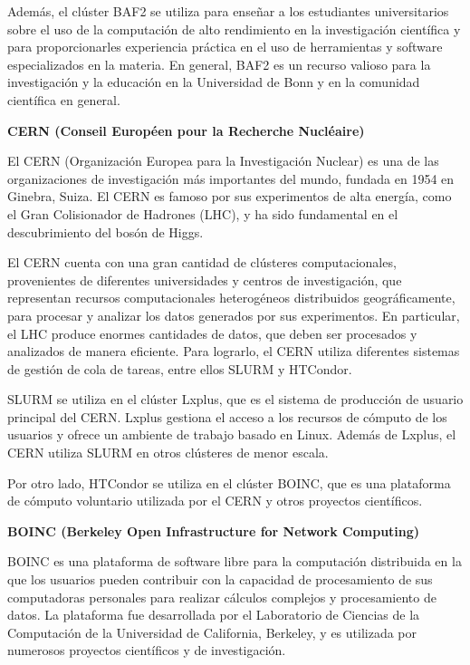 \begin{spacing}{1.5}
  Además, el clúster BAF2 se utiliza para enseñar a los estudiantes universitarios sobre el uso de la computación de alto rendimiento en la investigación científica y para proporcionarles experiencia práctica en el uso de herramientas y software especializados en la materia. En general, BAF2 es un recurso valioso para la investigación y la educación en la Universidad de Bonn y en la comunidad científica en general.

  \textbf{CERN (Conseil Européen pour la Recherche Nucléaire)}
  
  El CERN (Organización Europea para la Investigación Nuclear) es una de las organizaciones de investigación más importantes del mundo, fundada en 1954 en Ginebra, Suiza. El CERN es famoso por sus experimentos de alta energía, como el Gran Colisionador de Hadrones (LHC), y ha sido fundamental en el descubrimiento del bosón de Higgs.

  El CERN cuenta con una gran cantidad de clústeres computacionales, provenientes de diferentes universidades y centros de investigación, que representan recursos computacionales heterogéneos distribuidos geográficamente, para procesar y analizar los datos generados por sus experimentos. En particular, el LHC produce enormes cantidades de datos, que deben ser procesados y analizados de manera eficiente. Para lograrlo, el CERN utiliza diferentes sistemas de gestión de cola de tareas, entre ellos SLURM y HTCondor.

  SLURM se utiliza en el clúster Lxplus, que es el sistema de producción de usuario principal del CERN. Lxplus gestiona el acceso a los recursos de cómputo de los usuarios y ofrece un ambiente de trabajo basado en Linux. Además de Lxplus, el CERN utiliza SLURM en otros clústeres de menor escala.

  Por otro lado, HTCondor se utiliza en el clúster BOINC, que es una plataforma de cómputo voluntario utilizada por el CERN y otros proyectos científicos.

  \textbf{BOINC (Berkeley Open Infrastructure for Network Computing)}

  BOINC es una plataforma de software libre para la computación distribuida en la que los usuarios pueden contribuir con la capacidad de procesamiento de sus computadoras personales para realizar cálculos complejos y procesamiento de datos. La plataforma fue desarrollada por el Laboratorio de Ciencias de la Computación de la Universidad de California, Berkeley, y es utilizada por numerosos proyectos científicos y de investigación.


\end{spacing}
